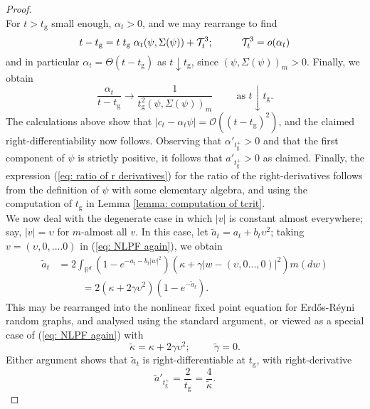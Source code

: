 \documentclass[11pt, notitlepage]{article}
\begin{document}
\begin{proof}
\begin{equation}
  \end{equation} For $t>t_\mathrm{g}$ small enough, $\alpha_t>0$, and we may rearrange to find \begin{equation} t-t_\mathrm{g}=t\hspace{0.1cm}t_\mathrm{g}\hspace{0.1cm}\alpha_t(\psi,\Sigma(\psi))+\mathcal{T}^3_t;\hspace{1cm} \mathcal{T}^3_t=o(\alpha_t) \end{equation}  and in particular $\alpha_t=\Theta(t-t_\mathrm{g})$ as $t\downarrow t_\mathrm{g}$, since $(\psi, \Sigma(\psi))_m>0.$ Finally, we obtain \begin{equation} \frac{\alpha_t}{t-t_\mathrm{g}}\rightarrow\frac{1}{t_\mathrm{g}^2(\psi,\Sigma(\psi))_m}\hspace{1cm} \text{as }t\downarrow t_\mathrm{g}.  \end{equation} The calculations above show that $|c_t-\alpha_t\psi|=\mathcal{O}((t-t_\mathrm{g})^2)$, and the claimed right-differentiability now follows. Observing that $\alpha'_{t_\mathrm{g}^+}>0$ and that the first component of $\psi$ is strictly positive, it follows that $a'_{t_\mathrm{g}^+}>0$ as claimed. Finally, the expression (\ref{eq: ratio of r derivatives}) for the ratio of the right-derivatives follows from the definition of $\psi$ with some elementary algebra, and using the computation of $t_\mathrm{g}$ in Lemma \ref{lemma: computation of tcrit}. \bigskip \\  We now deal with the degenerate case in which $|v|$ is constant almost everywhere; say,  $|v|=\upsilon$ for $m$-almost all $v$. In this case, let $\widetilde{a}_t=a_t+b_t\upsilon^2$; taking $v=(\upsilon, 0,....0)$ in (\ref{eq: NLPF again}), we obtain \begin{equation} \begin{split} \label{eq: degenerate NLFP}
 \widetilde{a}_t&=2\int_{\mathbb{R}^d} (1-e^{-a_t-b_t|w|^2})(\kappa+\gamma|w-(\upsilon,0...,0)|^2)m(dw) \\ & \hspace{1cm} = 2(\kappa+2\gamma\upsilon^2)(1-e^{-\widetilde{a}_t}).\end{split}\end{equation} This may be rearranged into the nonlinear fixed point equation for Erd\H{o}s-R\'eyni random graphs, and analysed using the standard argument, or viewed as a special case of (\ref{eq: NLPF again}) with  \begin{equation} \widetilde{\kappa}=\kappa+2\gamma\upsilon^2; \hspace{1cm}\widetilde{\gamma}=0. \end{equation} Either argument shows that $\widetilde{a}_t$ is right-differentiable at $t_\mathrm{g}$, with right-derivative \begin{equation} \widetilde{a}'_{t_\mathrm{g}^+}=\frac{2}{t_\mathrm{g}}=\frac{4}{\widetilde{\kappa}}.

\end{equation}
\end{proof}
\end{document}
